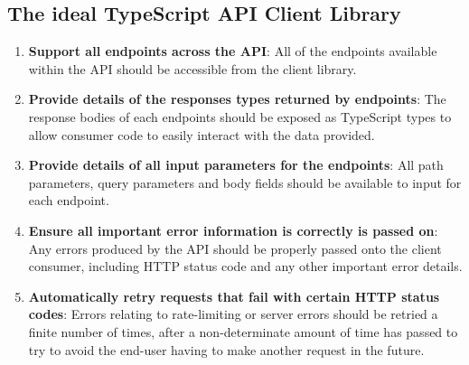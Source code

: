 \subsection{The ideal TypeScript API Client Library}
\begin{enumerate}
    \item \textbf{Support all endpoints across the API}: All of the endpoints available within the API should be accessible from the client library.
    \item \textbf{Provide details of the responses types returned by endpoints}: The response bodies of each endpoints should be exposed as TypeScript types to allow consumer code to easily interact with the data provided.
    \item \textbf{Provide details of all input parameters for the endpoints}: All path parameters, query parameters and body fields should be available to input for each endpoint.
    \item \textbf{Ensure all important error information is correctly is passed on}: Any errors produced by the API should be properly passed onto the client consumer, including HTTP status code and any other important error details.
    \item \textbf{Automatically retry requests that fail with certain HTTP status codes}: Errors relating to rate-limiting or server errors should be retried a finite number of times, after a non-determinate amount of time has passed to try to avoid the end-user having to make another request in the future.
\end{enumerate}


